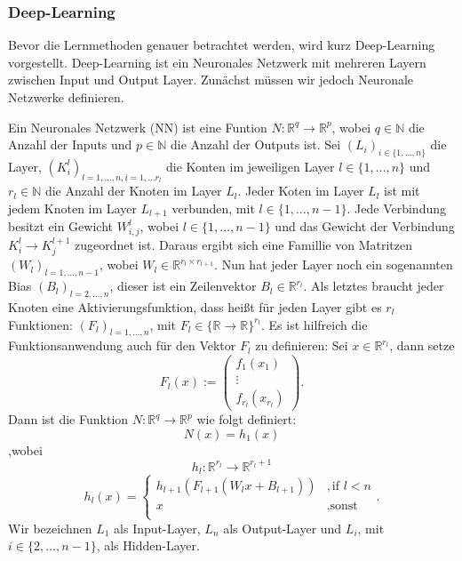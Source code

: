 \documentclass[12pt,letterpaper,ngerman]{article}
\begin{document}
\subsubsection{Deep-Learning}
Bevor die Lernmethoden genauer betrachtet werden, wird kurz Deep-Learning
vorgestellt. Deep-Learning ist ein Neuronales Netzwerk mit mehreren 
Layern zwischen Input und Output Layer. Zunächst müssen wir jedoch
Neuronale Netzwerke definieren. 
\begin{definition}
  Ein Neuronales Netzwerk (NN) ist eine Funtion $N: \mathbb{R}^q \to \mathbb{R}^p$,
  wobei $q\in \mathbb{N}$ die Anzahl der Inputs und $p \in \mathbb{N}$ die
  Anzahl der Outputs ist. Sei $(L_i)_{i \in \{ 1, \dots, n\}}$ die Layer,
  $(K_i^l)_{l=1,\dots, n, i = 1,\dots r_l}$ die Konten im jeweiligen Layer 
  $l \in \{1, \dots, n\}$ und $r_l \in \mathbb{N}$ die Anzahl der Knoten im
  Layer $L_l$. Jeder Koten im Layer $L_l$ ist mit jedem Knoten im 
  Layer $L_{l+1}$ verbunden, mit $l \in \{1,\dots, n-1\}$. Jede Verbindung
  besitzt ein Gewicht $W_{i,j}^l$, wobei $l \in \{1,\dots, n-1\}$ und 
  das Gewicht der Verbindung $K^l_i \to K^{l+1}_j$ zugeordnet ist.
  Daraus ergibt sich eine Famillie von Matritzen 
  $(W_l)_{l=1,\dots, n-1}$, wobei $ W_l\in \mathbb{R}^{r_l\times r_{l+1}}$.
  Nun hat jeder Layer noch ein sogenannten Bias $(B_l)_{l = 2,\dots,n}$,
  dieser ist ein Zeilenvektor $B_l \in \mathbb{R}^{r_l}$.
  Als letztes braucht jeder Knoten eine Aktivierungsfunktion, dass heißt
  für jeden Layer gibt es $r_l$ Funktionen:
  $(F_l)_{l=1,\dots,n}$, mit $F_l \in \{\mathbb{R} \to \mathbb{R}\}^{r_l}$.
  Es ist hilfreich die Funktionsanwendung auch für den Vektor $F_l$ zu definieren:
  Sei $x \in \mathbb{R}^{r_l}$, dann setze
  \[
    F_l(x) := \begin{pmatrix} 
        f_1(x_1) \\
        \vdots\\
        f_{r_l}(x_{r_l})
    \end{pmatrix}.
  \]
  Dann ist die Funktion $N: \mathbb{R}^q \to \mathbb{R}^p$ wie folgt definiert:
  \[
    N(x) = h_1(x)
  \]
  ,wobei
  \[h_l: \mathbb{R}^{r_l} \to \mathbb{R}^{r_l+1}\]
  \[
    h_l(x) = 
      \begin{cases}
        h_{l+1}(F_{l+1}(W_lx + B_{l+1}))& ,  \text{if } l < n \\ 
        x & , \text{sonst}\\
      \end{cases}.
  \]
  Wir bezeichnen $L_1$ als Input-Layer, $L_n$ als Output-Layer und
  $L_i$, mit $i \in \{2, \dots, n-1\}$, als Hidden-Layer.
\end{definition}
\end{document}
